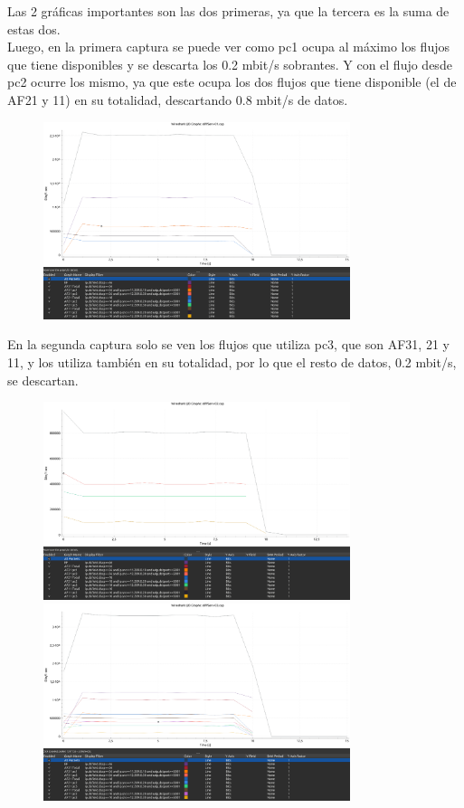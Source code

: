 \documentclass[12pt, a4paper]{report}
\begin{document}
\begin{enumerate}
	Las 2 gráficas importantes son las dos primeras, ya que la tercera es la suma de estas dos.\\
	
	Luego, en la primera captura se puede ver como pc1 ocupa al máximo los flujos que tiene disponibles y se descarta los 0.2 mbit/s sobrantes. Y con el flujo desde pc2 ocurre los mismo, ya que este ocupa los dos flujos que tiene disponible (el de AF21 y 11) en su totalidad, descartando 0.8 mbit/s de datos.
	\begin{figure}[H]
		\centering
		\includegraphics[width=0.8\textwidth]{ej2.1_3_13}
	\end{figure}
	En la segunda captura solo se ven los flujos que utiliza pc3, que son AF31, 21 y 11, y los utiliza también en su totalidad, por lo que el resto de datos, 0.2 mbit/s, se descartan.
	\begin{figure}[H]
		\centering
		\includegraphics[width=0.8\textwidth]{ej2.1_3_14}\\
		\includegraphics[width=0.8\textwidth]{ej2.1_3_15}
	\end{figure}
\end{enumerate}
\end{document}
